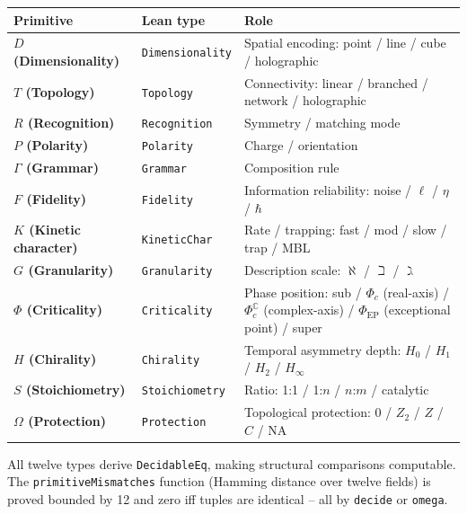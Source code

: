 \documentclass[12pt,a4paper]{article}
\begin{document}
\begin{table}[htbp]
\centering
\small
{}
\begin{tabularx}{\textwidth}{>{\centering\arraybackslash}X >{\centering\arraybackslash}X >{\centering\arraybackslash}X}
\toprule
\rowcolor{gray!25}\textbf{Primitive} & \textbf{Lean type} & \textbf{Role} \\
\midrule
\rowcolors{1}{white}{gray!10}
\textbf{$D$ (Dimensionality)} & \texttt{Dimensionality} & Spatial encoding: point / line / cube / holographic \\
\textbf{$T$ (Topology)} & \texttt{Topology} & Connectivity: linear / branched / network / holographic \\
\textbf{$R$ (Recognition)} & \texttt{Recognition} & Symmetry / matching mode \\
\textbf{$P$ (Polarity)} & \texttt{Polarity} & Charge / orientation \\
\textbf{$\Gamma$ (Grammar)} & \texttt{Grammar} & Composition rule \\
\textbf{$F$ (Fidelity)} & \texttt{Fidelity} & Information reliability: noise / $\ell$ / $\eta$ / $\hbar$ \\
\textbf{$K$ (Kinetic character)} & \texttt{KineticChar} & Rate / trapping: fast / mod / slow / trap / MBL \\
\textbf{$G$ (Granularity)} & \texttt{Granularity} & Description scale: $\aleph$ / $\beth$ / $\gimel$ \\
\textbf{$\Phi$ (Criticality)} & \texttt{Criticality} & Phase position: sub / $\Phi_c$ (real-axis) / $\Phi_c^\mathbb{C}$ (complex-axis) / $\Phi_\text{EP}$ (exceptional point) / super \\
\textbf{$H$ (Chirality)} & \texttt{Chirality} & Temporal asymmetry depth: $H_0$ / $H_1$ / $H_2$ / $H_{\infty}$ \\
\textbf{$S$ (Stoichiometry)} & \texttt{Stoichiometry} & Ratio: 1:1 / 1:$n$ / $n$:$m$ / catalytic \\
\textbf{$\Omega$ (Protection)} & \texttt{Protection} & Topological protection: $0$ / $Z_2$ / $Z$ / $C$ / NA \\
\bottomrule
\end{tabularx}
\end{table}

All twelve types derive \texttt{DecidableEq}, making structural comparisons computable. The \texttt{primitiveMismatches} function (Hamming distance over twelve fields) is proved bounded by 12 and zero iff tuples are identical  --  all by \texttt{decide} or \texttt{omega}.
\end{document}
